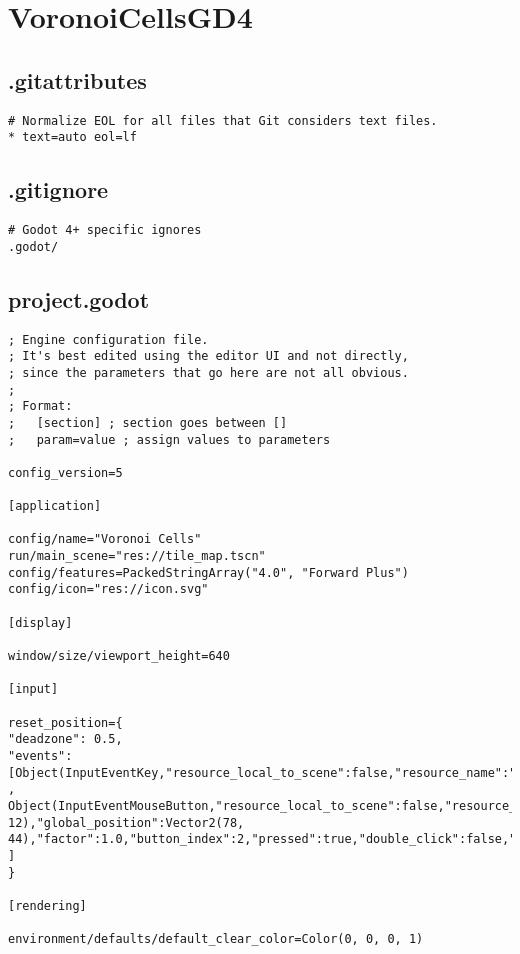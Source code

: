\section{VoronoiCellsGD4}


\subsection{.gitattributes}

\begin{lstlisting}
# Normalize EOL for all files that Git considers text files.
* text=auto eol=lf
\end{lstlisting}

\subsection{.gitignore}

\begin{lstlisting}
# Godot 4+ specific ignores
.godot/
\end{lstlisting}

\subsection{project.godot}

\begin{lstlisting}
; Engine configuration file.
; It's best edited using the editor UI and not directly,
; since the parameters that go here are not all obvious.
;
; Format:
;   [section] ; section goes between []
;   param=value ; assign values to parameters

config_version=5

[application]

config/name="Voronoi Cells"
run/main_scene="res://tile_map.tscn"
config/features=PackedStringArray("4.0", "Forward Plus")
config/icon="res://icon.svg"

[display]

window/size/viewport_height=640

[input]

reset_position={
"deadzone": 0.5,
"events": [Object(InputEventKey,"resource_local_to_scene":false,"resource_name":"","device":-1,"window_id":0,"alt_pressed":false,"shift_pressed":false,"ctrl_pressed":false,"meta_pressed":false,"pressed":false,"keycode":71,"physical_keycode":0,"key_label":0,"unicode":103,"echo":false,"script":null)
, Object(InputEventMouseButton,"resource_local_to_scene":false,"resource_name":"","device":-1,"window_id":0,"alt_pressed":false,"shift_pressed":false,"ctrl_pressed":false,"meta_pressed":false,"button_mask":2,"position":Vector2(75, 12),"global_position":Vector2(78, 44),"factor":1.0,"button_index":2,"pressed":true,"double_click":false,"script":null)
]
}

[rendering]

environment/defaults/default_clear_color=Color(0, 0, 0, 1)
\end{lstlisting}

